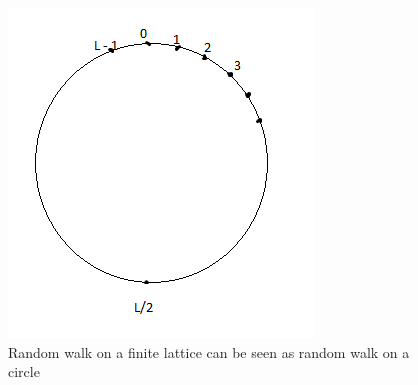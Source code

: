 \documentclass[a4paper,10pt,english]{article}
\begin{document}
\begin{figure}\label{circ}
	\centering
	\includegraphics[scale = 0.5]{circle.png}
	\caption{Random walk on a finite lattice can be seen as random walk on a circle}
	\label{circ}
\end{figure}
\end{document}
